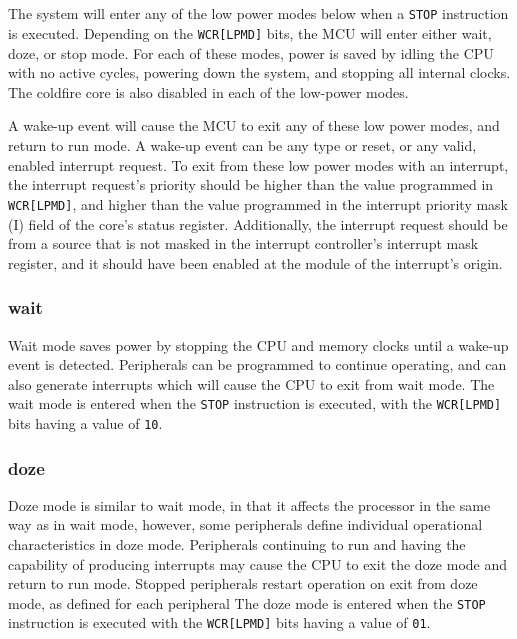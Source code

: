 \subsection*{}
The system will enter any of the low power modes below when a \texttt{STOP}
instruction is executed. Depending on the \texttt{WCR[LPMD]} bits, the MCU will
enter either wait, doze, or stop mode.
For each of these modes, power is saved by idling the CPU with no active
cycles, powering down the system, and stopping all internal clocks. The coldfire
core is also disabled in each of the low-power modes. 

A wake-up event will cause the MCU to exit any of these low power modes, and
return to run mode. A wake-up event can be any type or reset, or any valid,
enabled interrupt request. To exit from these low power modes with an interrupt,
the interrupt request's priority should be higher than the value programmed in
\texttt{WCR[LPMD]}, and higher than the value programmed in the interrupt
priority mask (I) field of the core’s status register. Additionally, the
interrupt request should be from a source that is not masked in the interrupt
controller’s interrupt mask register, and it should have been enabled at the
module of the interrupt’s origin.

\subsubsection*{wait} 
Wait mode saves power by stopping the CPU and memory clocks until a wake-up
event is detected. Peripherals can be programmed to continue operating, and can
also generate interrupts which will cause the CPU to exit from wait mode. The
wait mode is entered when the \texttt{STOP} instruction is executed, with the
\texttt{WCR[LPMD]} bits having a value of \texttt{10}.

\subsubsection*{doze} 
Doze mode is similar to wait mode, in that it affects the
processor in the same way as in wait mode, however, some peripherals define
individual operational characteristics in doze mode. Peripherals continuing to
run and having the capability of producing interrupts may cause the CPU to exit
the doze mode and return to run mode. Stopped peripherals restart operation on
exit from doze mode, as defined for each peripheral
The doze mode is entered when the \texttt{STOP} instruction is executed with the
\texttt{WCR[LPMD]} bits having a value of \texttt{01}.


